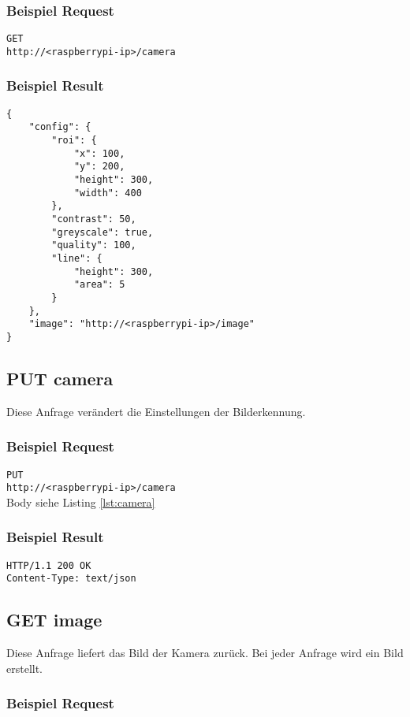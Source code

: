 \subsubsection{Beispiel Request}

\texttt{GET} \\
\texttt{http://<raspberrypi-ip>/camera}

\subsubsection{Beispiel Result}

\begin{lstlisting}[caption=GET camera Result, label=lst:camera, tabsize=2]
{
	"config": {
		"roi": {
			"x": 100,
			"y": 200,
			"height": 300,
			"width": 400
		},
		"contrast": 50,
		"greyscale": true,
		"quality": 100,
		"line": {
			"height": 300,
			"area": 5
		}
	},
	"image": "http://<raspberrypi-ip>/image"
}
\end{lstlisting}

\subsection{PUT camera}

Diese Anfrage verändert die Einstellungen der Bilderkennung.

\subsubsection{Beispiel Request}

\texttt{PUT} \\
\texttt{http://<raspberrypi-ip>/camera} \\
Body siehe Listing \ref{lst:camera}

\subsubsection{Beispiel Result}

\texttt{HTTP/1.1 200 OK} \\
\texttt{Content-Type: text/json}

\subsection{GET image}

Diese Anfrage liefert das Bild der Kamera zurück. Bei jeder Anfrage wird ein Bild erstellt.

\subsubsection{Beispiel Request}

